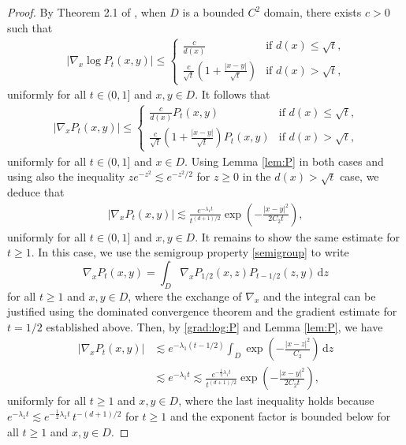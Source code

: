 \documentclass[reqno]{amsart}
\renewcommand{\d}{\mathrm d}
\newcommand{\1}{\mathbf 1}
\numberwithin{equation}{section}
\theoremstyle{definition}
\begin{document}
\begin{proof}
By Theorem 2.1 of \cite{Z06}, when $D$ is a bounded $C^2$ domain, there exists $c>0$ such that
\begin{align*}
	|\nabla_x \log P_t(x,y)| \le 
	\begin{cases}
	\frac{c}{d(x)} & \text{if $d(x) \le \sqrt{t}$,}\\
	\frac{c}{\sqrt{t}} \left( 1+ \frac{|x-y|}{\sqrt{t}}\right) & \text{if $d(x)>\sqrt{t}$,}
	\end{cases}
\end{align*}
uniformly for all $t \in (0,1]$ and $x,y \in D$.
It follows that
\begin{align*}
	|\nabla_x P_t(x,y)| \le 
	\begin{cases}
	\frac{c}{d(x)}P_t(x,y) & \text{if $d(x) \le \sqrt{t}$,}\\
	\frac{c}{\sqrt{t}} \left( 1+ \frac{|x-y|}{\sqrt{t}}\right)P_t(x,y) & \text{if $d(x)>\sqrt{t}$,}
	\end{cases}
\end{align*}
uniformly for all $t \in (0,1]$ and $x \in D$.
Using Lemma \ref{lem:P} in both cases and using also the inequality $z e^{-z^2} \lesssim e^{-z^2/2}$ for $z \ge 0$ in the  $d(x)>\sqrt{t}$ case, we deduce that
\begin{align}\label{grad:log:P}
	|\nabla_x P_t(x,y)| \lesssim \frac{e^{-\lambda_1 t}}{t^{(d+1)/2}} \exp\left( - \frac{|x-y|^2}{2C_2 t} \right),
\end{align}
uniformly for all $t \in (0,1]$ and $x,y \in D$.
It remains to show the same estimate for $t\ge 1$.
In this case, we use the semigroup property \eqref{semigroup} to write
\[
	\nabla_x P_t(x,y) = \int_D \nabla_x P_{1/2}(x,z) P_{t-1/2}(z,y) \, \d z
\]
for all $t \ge 1$ and $x,y \in D$, where the exchange of $\nabla_x$ and the integral can be justified using the dominated convergence theorem and the gradient estimate for $t=1/2$ established above.
Then, by \eqref{grad:log:P} and Lemma \ref{lem:P}, we have
\begin{align*}
	|\nabla_x P_t(x,y)| &\lesssim e^{-\lambda_1(t-1/2)} \int_D  \exp\left( - \frac{|x-z|^2}{C_2} \right) \, \d z\\
	& \lesssim e^{-\lambda_1 t} \lesssim \frac{e^{-\frac12\lambda_1 t}}{t^{(d+1)/2}} \exp\left( - \frac{|x-y|^2}{2C_2t} \right),
\end{align*}
uniformly for all $t \ge 1$ and $x,y \in D$, where the last inequality holds because $e^{-\lambda_1 t} \lesssim e^{-\frac12 \lambda_1 t}\,t^{-(d+1)/2}$ for $t \ge 1$ and the exponent factor is bounded below for all $t \ge 1$ and $x,y \in D$.
\end{proof}
\end{document}
